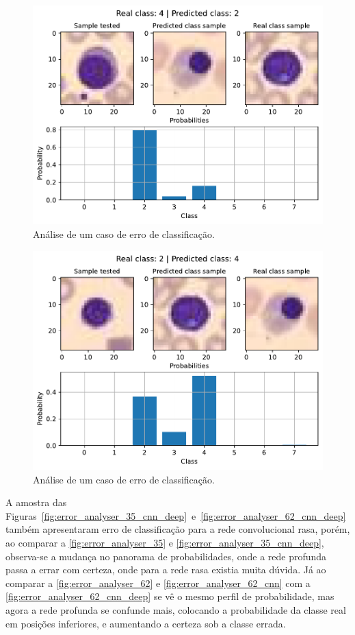 \begin{figure}[H]
\centering
\includegraphics[width=0.75\linewidth]{../../plot/cnn_deep/error_analyser_187}
\caption{Análise de um caso de erro de classificação.}
\label{fig:error_analyser_187}
\end{figure}

\begin{figure}[H]
\centering
\includegraphics[width=0.75\linewidth]{../../plot/cnn_deep/error_analyser_259}
\caption{Análise de um caso de erro de classificação.}
\label{fig:error_analyser_259}
\end{figure}

A amostra das Figuras~\ref{fig:error_analyser_35_cnn_deep}~e~\ref{fig:error_analyser_62_cnn_deep} também apresentaram erro de classificação para a rede convolucional rasa, porém, ao comparar a \autoref{fig:error_analyser_35} e \autoref{fig:error_analyser_35_cnn_deep}, observa-se a mudança no panorama de probabilidades, onde a rede profunda passa a errar com certeza, onde para a rede rasa existia muita dúvida. Já ao comparar a \autoref{fig:error_analyser_62} e \autoref{fig:error_analyser_62_cnn} com a \autoref{fig:error_analyser_62_cnn_deep} se vê o mesmo perfil de probabilidade, mas agora a rede profunda se confunde mais, colocando a probabilidade da classe real em posições inferiores, e aumentando a certeza sob a classe errada.

